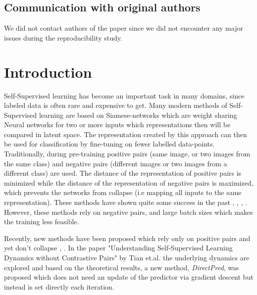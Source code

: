 \subsection*{Communication with original authors}


We did not contact authors of the paper since we did not encounter any major issues during the reproducibility study. 

\clearpage

\section{Introduction}
\label{sec:intro}
Self-Supervised learning has become an important task in many domains, since labeled data is often rare and expensive to get. Many modern methods of Self-Supervised learning are based on Siamese-networks \cite{Bromley_93} which are weight sharing Neural networks for two or more inputs which representations then will be compared in latent space. The representation created by this approach can then be used for classification by fine-tuning on fewer labelled data-points. Traditionally, during pre-training positive pairs (same image, or two images from the same class) and negative pairs (different images or two images from a different class) are used. The distance of the representation of positive pairs is minimized while the distance of the representation of negative pairs is maximized, which prevents the networks from collapse (i.e mapping all inputs to the same representation). These methods have shown quite some success in the past \cite{chen2020simple}, \cite{chen2020big}, \cite{he2020momentum}, \cite{oord2019representation}. However, these methods rely on negative pairs, and large batch sizes which makes the training less feasible. 

Recently, new methods have been proposed which rely only on positive pairs and yet don't collapse \cite{grill2020bootstrap}, \cite{chen2020exploring}. In the paper "Understanding Self-Supervised Learning Dynamics without Contrastive Pairs" by Tian et.al. \cite{tian2021understanding} the underlying dynamics are explored and based on the theoretical results, a new method, \emph{DirectPred}, was proposed which does not need an update of the predictor via gradient descent but instead is set directly each iteration. 



